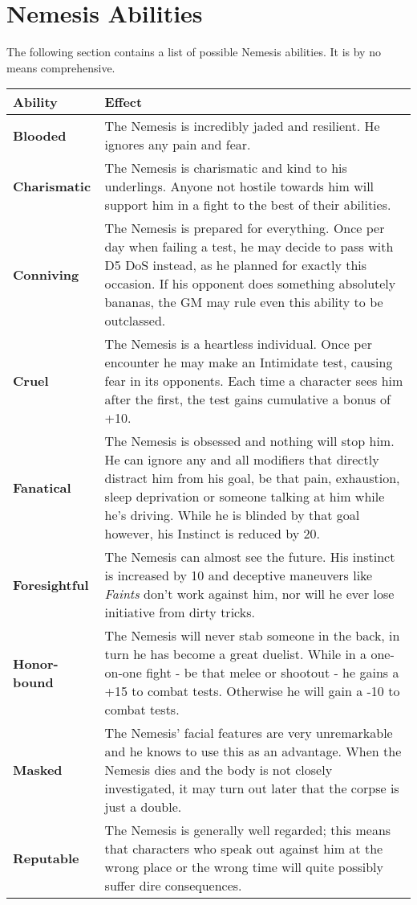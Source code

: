 \documentclass[12pt,a4paper,openany]{book}
\begin{document}
	\section*{Nemesis Abilities}
	The following section contains a list of possible Nemesis abilities. It is by no means comprehensive.
	{\setlength{\extrarowheight}{5pt}
	\begin{tabularx}{\textwidth}{l|X}
		Ability & Effect\\
		\hline
		\textbf{Blooded} & The Nemesis is incredibly jaded and resilient. He ignores any pain and fear.\\
		\hline
		\textbf{Charismatic} & The Nemesis is charismatic and kind to his underlings. Anyone not hostile towards him will support him in a fight to the best of their abilities.\\
		\hline
		\textbf{Conniving} & The Nemesis is prepared for everything. Once per day when failing a test, he may decide to pass with D5 DoS instead, as he planned for exactly this occasion. If his opponent does something absolutely bananas, the GM may rule even this ability to be outclassed.\\
		\hline
		\textbf{Cruel} & The Nemesis is a heartless individual. Once per encounter he may make an Intimidate test, causing fear in its opponents. Each time a character sees him after the first, the test gains cumulative a bonus of +10.\\
		\hline
		\textbf{Fanatical} & The Nemesis is obsessed and nothing will stop him. He can ignore any and all modifiers that directly distract him from his goal, be that pain, exhaustion, sleep deprivation or someone talking at him while he's driving. While he is blinded by that goal however, his Instinct is reduced by 20.\\
		\hline
		\textbf{Foresightful} & The Nemesis can almost see the future. His instinct is increased by 10 and deceptive maneuvers like \emph{Faints} don't work against him, nor will he ever lose initiative from dirty tricks.\\
		\hline
		\textbf{Honor-bound} & The Nemesis will never stab someone in the back, in turn he has become a great duelist. While in a one-on-one fight - be that melee or shootout - he gains a +15 to combat tests. Otherwise he will gain a -10 to combat tests.\\
		\hline
		\textbf{Masked} & The Nemesis' facial features are very unremarkable and he knows to use this as an advantage. When the Nemesis dies and the body is not closely investigated, it may turn out later that the corpse is just a double.\\
		\hline
		\textbf{Reputable} & The Nemesis is generally well regarded; this means that characters who speak out against him at the wrong place or the wrong time will quite possibly suffer dire consequences.\\
		\hline

	\end{tabularx}}
\end{document}
